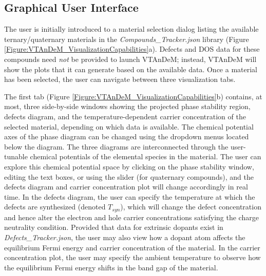\documentclass[%
 reprint,
 amsmath,amssymb,
 aps,
]{revtex4-1}
\begin{document}




\subsection{Graphical User Interface}

The user is initially introduced to a material selection dialog listing the available ternary/quaternary materials in the \textit{Compounds\_Tracker.json} library (Figure \ref{Figure:VTAnDeM_VisualizationCapabilities}a). Defects and DOS data for these compounds need \textit{not} be provided to launch VTAnDeM; instead, VTAnDeM will show the plots that it can generate based on the available data. Once a material has been selected, the user can navigate between three visualization tabs.

The first tab (Figure \ref{Figure:VTAnDeM_VisualizationCapabilities}b) contains, at most, three side-by-side windows showing the projected phase stability region, defects diagram, and the temperature-dependent carrier concentration of the selected material, depending on which data is available. The chemical potential axes of the phase diagram can be changed using the dropdown menus located below the diagram. The three diagrams are interconnected through the user-tunable chemical potentials of the elemental species in the material. The user can explore this chemical potential space by clicking on the phase stability window, editing the text boxes, or using the slider (for quaternary compounds), and the defects diagram and carrier concentration plot will change accordingly in real time. In the defects diagram, the user can specify the temperature at which the defects are synthesized (denoted $T_{syn}$), which will change the defect concentration and hence alter the electron and hole carrier concentrations satisfying the charge neutrality condition. Provided that data for extrinsic dopants exist in \textit{Defects\_Tracker.json}, the user may also view how a dopant atom affects the equilibrium Fermi energy and carrier concentration of the material. In the carrier concentration plot, the user may specify the ambient temperature to observe how the equilibrium Fermi energy shifts in the band gap of the material.
\end{document}
